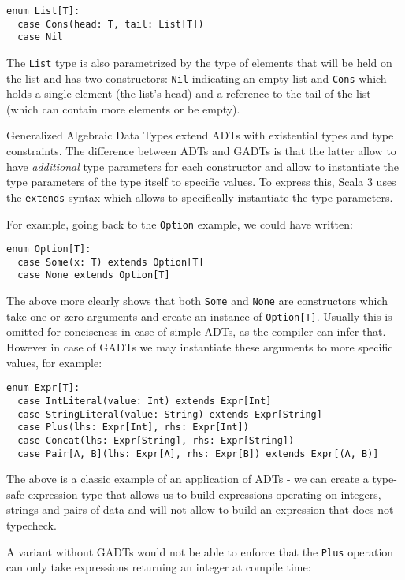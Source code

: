 \begin{verbatim}
enum List[T]:
  case Cons(head: T, tail: List[T])
  case Nil
\end{verbatim}

The \texttt{List} type is also parametrized by the type of elements that will be held on the list and has two constructors: \texttt{Nil} indicating an empty list and \texttt{Cons} which holds a single element (the list's head) and a reference to the tail of the list (which can contain more elements or be empty).

Generalized Algebraic Data Types extend ADTs with existential types and type constraints. The difference between ADTs and GADTs is that the latter allow to have \textit{additional} type parameters for each constructor and allow to instantiate the type parameters of the type itself to specific values. To express this, Scala 3 uses the \texttt{extends} syntax which allows to specifically instantiate the type parameters.

For example, going back to the \texttt{Option} example, we could have written:

\begin{verbatim}
enum Option[T]:
  case Some(x: T) extends Option[T]
  case None extends Option[T]
\end{verbatim}

The above more clearly shows that both \texttt{Some} and \texttt{None} are constructors which take one or zero arguments and create an instance of \texttt{Option[T]}. Usually this is omitted for conciseness in case of simple ADTs, as the compiler can infer that. However in case of GADTs we may instantiate these arguments to more specific values, for example:

\begin{verbatim}
enum Expr[T]:
  case IntLiteral(value: Int) extends Expr[Int]
  case StringLiteral(value: String) extends Expr[String]
  case Plus(lhs: Expr[Int], rhs: Expr[Int])
  case Concat(lhs: Expr[String], rhs: Expr[String])
  case Pair[A, B](lhs: Expr[A], rhs: Expr[B]) extends Expr[(A, B)]
\end{verbatim}

The above is a classic example of an application of ADTs - we can create a type-safe expression type that allows us to build expressions operating on integers, strings and pairs of data and will not allow to build an expression that does not typecheck.

A variant without GADTs would not be able to enforce that the \texttt{Plus} operation can only take expressions returning an integer at compile time:

